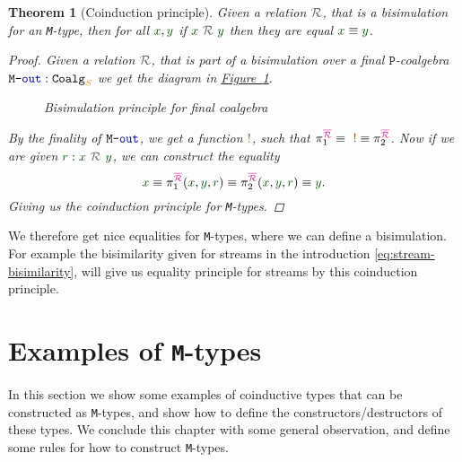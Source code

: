 \documentclass[twoside,11pt,openright]{report}
\theoremstyle{plain} %
\newtheorem{thm}{Theorem}[section]
\theoremstyle{definition}
\theoremstyle{remark}
\newcommand*{\figref}[1]{\hyperref[fig:#1]{Figure~\ref*{fig:#1}}}
\newcommand*{\term}[1]{\textcolor{green!30!black}{#1}} %
\newcommand*{\type}[1]{\textcolor{magenta!90!black}{#1}}
\newcommand*{\container}[1]{\textcolor{orange}{#1}}
\newcommand*{\coalg}[2]{#1\texttt{-}#2}
\newcommand*{\relation}[1]{\textcolor{gray!75!black}{\ensuremath{\mathtt{#1}}}}
\newcommand*{\constant}[1]{\textcolor{orange!60!black}{\ensuremath{\mathtt{#1}}}}
\newcommand*{\function}[1]{\textcolor{blue!60!black}{\ensuremath{\mathtt{#1}}}}
\newcommand*{\typeformer}[1]{\ensuremath{\mathtt{#1}}}
\newcommand*{\functor}[1]{\ensuremath{\mathbf{\mathtt{#1}}}}
\begin{document}
\begin{thm}[Coinduction principle]
  \label{thm:M-coinduction-principle}
  Given a relation \(\relation{\mathcal{R}}\), that is a bisimulation for an \texttt{M}-type, then for all \(\term{x},\term{y}\) if \(\term{x}~\relation{\mathcal{R}}~\term{y}\) then they are equal \(\term{x} \equiv \term{y}\).  
  \begin{proof}
    Given a relation \(\relation{\mathcal{R}}\), that is part of a bisimulation over a final \(\functor{P}\)-coalgebra \(\coalg{\typeformer{M}}{\function{out}}:\mathtt{Coalg}_{\container{S}}\) we get the diagram in \figref{final-coalgebra-coinduction}.
    \begin{figure}[h]
      \centering
      \caption{Bisimulation principle for final coalgebra}
      \label{fig:final-coalgebra-coinduction}
    \end{figure}
    By the finality of \(\coalg{\typeformer{M}}{\function{out}}\), we get a function \(\constant{!}\), such that \(\pi_1^{\type{\overline{\mathcal{R}}}} \equiv ~\constant{!} \equiv \pi_2^{\type{\overline{\mathcal{R}}}}\). Now if we are given \(\term{r} : \term{x}~\relation{\mathcal{R}}~\term{y}\), we can construct the equality
    \begin{equation}
      \term{x} \equiv \pi_1^{\type{\overline{\mathcal{R}}}} (\term{x}, \term{y}, \term{r}) \equiv \pi_2^{\type{\overline{\mathcal{R}}}} (\term{x}, \term{y}, \term{r}) \equiv \term{y}.
    \end{equation}
    Giving us the coinduction principle for \texttt{M}-types.
  \end{proof}
\end{thm}
\noindent We therefore get nice equalities for \texttt{M}-types, where we can define a bisimulation. For example the bisimilarity given for streams in the introduction \eqref{eq:stream-bisimilarity}, will give us equality principle for streams by this coinduction principle.


\section{Examples of \texttt{M}-types}
\label{ch:M-types-examples}
In this section we show some examples of coinductive types that can be constructed as \texttt{M}-types, and show how to define the constructors/destructors of these types. We conclude this chapter with some general observation, and define some rules for how to construct \texttt{M}-types. 
\end{document}
